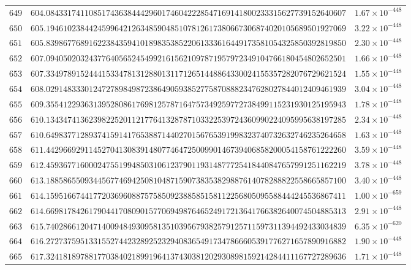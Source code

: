 \documentclass[12pt,reqno]{amsart}
\theoremstyle{remark}
\begin{document}
\begin{longtable}{clc}
$649$ & $604.0843317411085174363844429601746042228547169141800233315627739152640607$ & $1.67\times 10^{-448}$ \\
$650$ & $605.1946102384424599642126348590485107812617380667306874020105689501927069$ & $3.22\times 10^{-448}$ \\
$651$ & $605.8398677689162238435941018983538522061333616449173581054325850392819850$ & $2.30\times 10^{-448}$ \\
$652$ & $607.0940502032437764056524549921615621097871957972349104766180454802652501$ & $1.66\times 10^{-448}$ \\
$653$ & $607.3349789152444153347813128801311712651448864330024155357282076729621524$ & $1.55\times 10^{-448}$ \\
$654$ & $608.0291483330124727898498723864905938527758708882347628027844012409461939$ & $3.04\times 10^{-448}$ \\
$655$ & $609.3554122936313952808617698125787164757349259772738499115231930125195943$ & $1.78\times 10^{-448}$ \\
$656$ & $610.1343474136239822520112177641328787103322539724360990224095995638197285$ & $2.34\times 10^{-448}$ \\
$657$ & $610.6498377128937415914176538871440270156765391998323740732632746235264658$ & $1.63\times 10^{-448}$ \\
$658$ & $611.4429669291145270413083914807746472500990146739406858200054158761222260$ & $3.59\times 10^{-448}$ \\
$659$ & $612.4593677160002475519948503106123790119314877725418440847657991251162219$ & $3.78\times 10^{-448}$ \\
$660$ & $613.1885865509344567746942508104871590738353829887614078288822558665857100$ & $3.40\times 10^{-448}$ \\
$661$ & $614.1595166744177203696088757585092388585158112256805095588444245536867411$ & $1.00\times 10^{-659}$ \\
$662$ & $614.6698178426179044170809015770694987646524917213641766382640074504885313$ & $2.91\times 10^{-448}$ \\
$663$ & $615.7402866120471400948493095813510395679382579125711597311394492433034839$ & $6.35\times 10^{-620}$ \\
$664$ & $616.2727375951331552744232892523294083654917347866605391776271657890916882$ & $1.90\times 10^{-448}$ \\
$665$ & $617.3241818978817703840218991964137430381202930898159214284411167727289636$ & $1.71\times 10^{-448}$ \\

\end{longtable}
\end{document}
